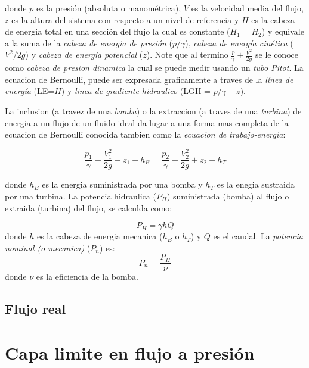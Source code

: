 \documentclass[10pt, oneside]{article}
\begin{document}
donde $p$ es la presi\'on (absoluta o manom\'etrica), $V$ es la velocidad media del flujo, $z$ es la altura del sistema con respecto a un nivel de referencia y $H$ es la cabeza de energia total en una secci\'on del flujo la cual es constante ($H_1 = H_2 $) y equivale a la suma de la \emph{cabeza de energia de presi\'on} ($p/\gamma$), \emph{cabeza de energ\'ia cin\'etica} ($V^2 /2g$) y \emph{cabeza de energia potencial} ($z$). Note que al termino $\frac{p}{\gamma} + \frac{V^2}{2g}$ se le conoce como \emph{cabeza de presion dinamica} la cual se puede medir usando un \emph{tubo Pitot}. La ecuacion de Bernoulli, puede ser expresada graficamente a traves de la \emph{l\'inea de energ\'ia} (LE=$H$) y \emph{linea de gradiente hidraulico} (LGH = $p/\gamma + z$).

La inclusion (a travez de una \emph{bomba}) o la extraccion (a traves de una \emph{turbina}) de energia a un flujo de un fluido ideal da lugar a una forma mas completa de la ecuacion de Bernoulli conocida tambien como la \emph{ecuacion de trabajo-energia}:

\begin{equation}
\frac{p_1}{\gamma} + \frac{V_1^2}{2g} + z_1 + h_B =\frac{p_2}{\gamma} + \frac{V_2^2}{2g} + z_2 + h_T
\end{equation}

donde $h_B$ es la energia suministrada por una bomba y $h_T$ es la enegia sustraida por una turbina. La potencia hidraulica ($P_H$) suministrada (bomba) al flujo o extraida (turbina) del flujo, se calculda como:

\begin{equation}
P_H = \gamma h Q
\end{equation}
donde $h$ es la cabeza de energia mecanica ($h_B$ o $h_T$) y $Q$ es el caudal. La \emph{potencia nominal (o mecanica)} ($P_n$) es:
\begin{equation}
P_n = \frac{P_H}{\nu}
\end{equation}
donde $\nu$ es la eficiencia de la bomba.
 
\subsection{Flujo real}




\section{Capa limite en flujo a presi\'on}
\end{document}
